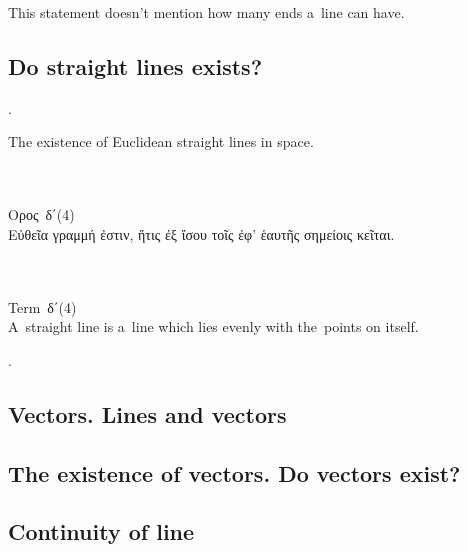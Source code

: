 This statement doesn’t mention how many ends a~line can have.

\subsection{Do straight lines exists?}

.

\noindent
The existence of
Euclidean straight lines
in space.

{\small
\setlength{\parindent}{0pt}

\nopagebreak%
\begin{multicols}{2}
%
\\
\\[.3em]
\textgreek{Ορος}~\textgreek{δ΄}\:(4)\\[.1em]
\textgreek{Εὐθεῖα γραμμή ἐστιν, ἥτις ἐξ ἴσου τοῖς ἐφ' ἑαυτῆς σημείοις κεῖται.}

\columnbreak
%
\\
\\[.3em]
Term~\textgreek{δ΄}\:(4)\\[.1em]
A~straight line is a~line which lies evenly with the~points on itself.
%
\end{multicols}
\par}

.

\subsection{Vectors. Lines and vectors}

\subsection{The existence of vectors. Do vectors exist?}

\subsection{Continuity of line}

